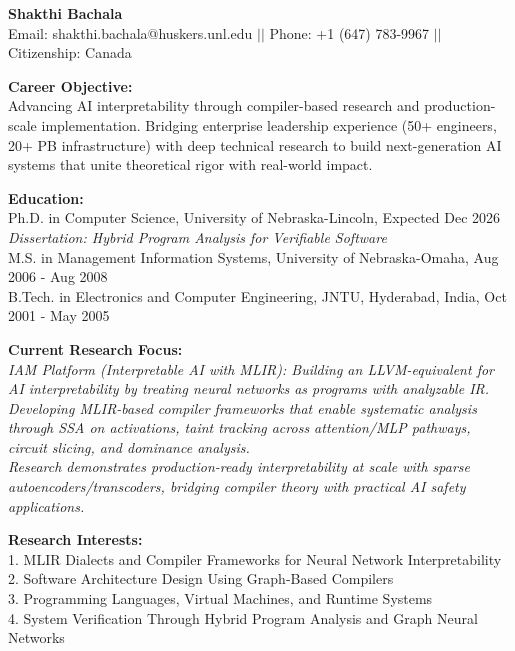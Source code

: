 \documentclass[10pt,letterpaper]{article}
\begin{document}
\begin{center}
{\Large \textbf{Shakthi Bachala}} \\
\vspace{3pt}
Email: shakthi.bachala@huskers.unl.edu \hspace{0.5cm} $||$ \hspace{0.5cm} Phone: +1 (647) 783-9967 \hspace{0.5cm} $||$ \hspace{0.5cm} Citizenship: Canada
\end{center}

\vspace{6pt}

\textbf{Career Objective:} \\ 
Advancing AI interpretability through compiler-based research and production-scale implementation. Bridging enterprise leadership experience (50+ engineers, 20+ PB infrastructure) with deep technical research to build next-generation AI systems that unite theoretical rigor with real-world impact.

\textbf{Education:} \\
Ph.D. in Computer Science, University of Nebraska-Lincoln, Expected Dec 2026 \\
\textit{Dissertation: Hybrid Program Analysis for Verifiable Software} \\
M.S. in Management Information Systems, University of Nebraska-Omaha, Aug 2006 - Aug 2008 \\
B.Tech. in Electronics and Computer Engineering, JNTU, Hyderabad, India, Oct 2001 - May 2005

\textbf{Current Research Focus:} \\
\textit{IAM Platform (Interpretable AI with MLIR): Building an LLVM-equivalent for AI interpretability by treating neural networks as programs with analyzable IR. \\ 
Developing MLIR-based compiler frameworks that enable systematic analysis through SSA on activations, taint tracking across attention/MLP pathways, circuit slicing, and dominance analysis. \\
Research demonstrates production-ready interpretability at scale with sparse autoencoders/transcoders, bridging compiler theory with practical AI safety applications.}

\textbf{Research Interests:} \\
1. MLIR Dialects and Compiler Frameworks for Neural Network Interpretability\\
2. Software Architecture Design Using Graph-Based Compilers \\
3. Programming Languages, Virtual Machines, and Runtime Systems \\
4. System Verification Through Hybrid Program Analysis and Graph Neural Networks
\end{document}
